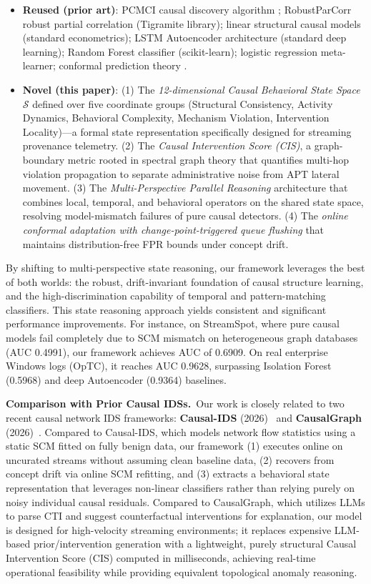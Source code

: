 \begin{itemize}
\item \textbf{Reused (prior art)}: PCMCI causal discovery algorithm \cite{pcmci2019}; RobustParCorr robust partial correlation (Tigramite library); linear structural causal models (standard econometrics); LSTM Autoencoder architecture (standard deep learning); Random Forest classifier (scikit-learn); logistic regression meta-learner; conformal prediction theory \cite{angelopoulos2021gentle}.
\item \textbf{Novel (this paper)}: (1) The \emph{12-dimensional Causal Behavioral State Space} $\mathcal{S}$ defined over five coordinate groups (Structural Consistency, Activity Dynamics, Behavioral Complexity, Mechanism Violation, Intervention Locality)---a formal state representation specifically designed for streaming provenance telemetry. (2) The \emph{Causal Intervention Score (CIS)}, a graph-boundary metric rooted in spectral graph theory \cite{chung1997spectral} that quantifies multi-hop violation propagation to separate administrative noise from APT lateral movement. (3) The \emph{Multi-Perspective Parallel Reasoning} architecture that combines local, temporal, and behavioral operators on the shared state space, resolving model-mismatch failures of pure causal detectors. (4) The \emph{online conformal adaptation with change-point-triggered queue flushing} that maintains distribution-free FPR bounds under concept drift.
\end{itemize}

By shifting to multi-perspective state reasoning, our framework leverages the best of both worlds: the robust, drift-invariant foundation of causal structure learning, and the high-discrimination capability of temporal and pattern-matching classifiers. This state reasoning approach yields consistent and significant performance improvements. For instance, on StreamSpot, where pure causal models fail completely due to SCM mismatch on heterogeneous graph databases (AUC 0.4991), our framework achieves AUC of 0.6909. On real enterprise Windows logs (OpTC), it reaches AUC 0.9628, surpassing Isolation Forest (0.5968) and deep Autoencoder (0.9364) baselines.

\textbf{Comparison with Prior Causal IDSs.}~Our work is closely related to two recent causal network IDS frameworks: \textbf{Causal-IDS} (2026)~\cite{causalids2026} and \textbf{CausalGraph} (2026)~\cite{causalgraph2026}.
Compared to Causal-IDS, which models network flow statistics using a static SCM fitted on fully benign data, our framework (1) executes online on uncurated streams without assuming clean baseline data, (2) recovers from concept drift via online SCM refitting, and (3) extracts a behavioral state representation that leverages non-linear classifiers rather than relying purely on noisy individual causal residuals.
Compared to CausalGraph, which utilizes LLMs to parse CTI and suggest counterfactual interventions for explanation, our model is designed for high-velocity streaming environments; it replaces expensive LLM-based prior/intervention generation with a lightweight, purely structural Causal Intervention Score (CIS) computed in milliseconds, achieving real-time operational feasibility while providing equivalent topological anomaly reasoning.


